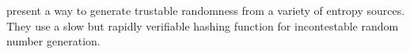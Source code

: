 \item[A Random Zoo: sloth, unicorn \& trx]
\citet*{lenstra2015random} present a way to generate trustable randomness from a variety of entropy sources. They use a slow but rapidly verifiable hashing function for incontestable random number generation. %
